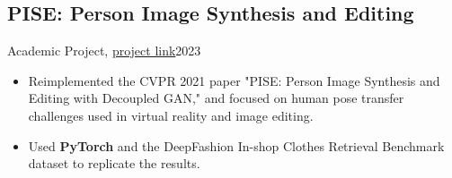 \subsection{PISE: Person Image Synthesis and Editing}{Academic Project, \href{https://github.com/Negiiiin/PISE}{project link}}{2023}
\begin{itemize}
    \item Reimplemented the CVPR 2021 paper "PISE: Person Image Synthesis and Editing with Decoupled GAN," and focused on human pose transfer challenges used in virtual reality and image editing.
    \item Used \textbf{PyTorch} and the DeepFashion In-shop Clothes Retrieval Benchmark dataset to replicate the results.
\end{itemize}
